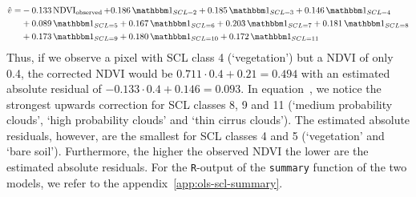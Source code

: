 	\begin{equation}\label{eq:corr_lm_res}
		\begin{aligned}		
			\hat v  = &
			-0.133 \operatorname{NDVI}_\text{observed}  
			+ 0.186 \, \mathbbm 1_{{SCL = 2}} 
			+ 0.185 \, \mathbbm 1_{{SCL = 3}} 
			+ 0.146 \, \mathbbm 1_{{SCL = 4}} \\ &
			+ 0.089 \, \mathbbm 1_{{SCL = 5}} 
			+ 0.167 \, \mathbbm 1_{{SCL = 6}} 
			+ 0.203 \, \mathbbm 1_{{SCL = 7}} 
			+ 0.181 \, \mathbbm 1_{{SCL = 8}} \\ & 
			+ 0.173 \, \mathbbm 1_{{SCL = 9}} 
			+ 0.180 \, \mathbbm 1_{{SCL = 10}} 
			+ 0.172 \, \mathbbm 1_{{SCL = 11}} 
		\end{aligned}
	\end{equation} 
	Thus, if we observe a pixel with SCL class 4 (`vegetation') but a NDVI of only 0.4, the corrected NDVI would be $0.711 \cdot 0.4 + 0.21 = 0.494$ with an estimated absolute residual of $-0.133 \cdot 0.4 + 0.146 = 0.093$.
	In equation~, we notice the strongest upwards correction for SCL classes 8, 9 and 11 (`medium probability clouds', `high probability clouds' and `thin cirrus clouds'). The estimated absolute residuals, however, are the smallest for SCL classes 4 and 5 (`vegetation' and `bare soil'). Furthermore, the higher the observed NDVI the lower are the estimated absolute residuals.
	For the \texttt{R}-output of the \texttt{summary} function of the two models, we refer to the appendix~\ref{app:ols-scl-summary}. 


	








